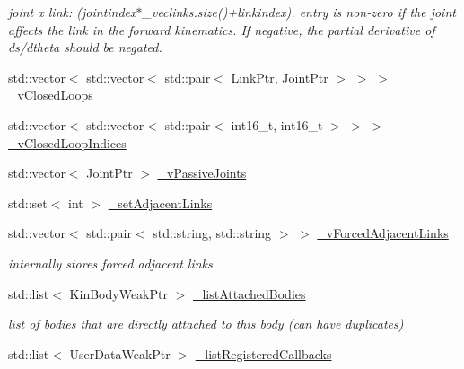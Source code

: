 \begin{DoxyCompactItemize}
\begin{DoxyCompactList}\small\item\em joint x link: (jointindex$\ast$\_\-veclinks.size()+linkindex). entry is non-\/zero if the joint affects the link in the forward kinematics. If negative, the partial derivative of ds/dtheta should be negated. \item\end{DoxyCompactList}\item 
std::vector$<$ std::vector$<$ std::pair$<$ LinkPtr, JointPtr $>$ $>$ $>$ \hyperlink{classOpenRAVE_1_1KinBody_a0c06bbb41fb3ba4098d486fd90699140}{\_\-vClosedLoops}
\item 
std::vector$<$ std::vector$<$ std::pair$<$ int16\_\-t, int16\_\-t $>$ $>$ $>$ \hyperlink{classOpenRAVE_1_1KinBody_a00df6713c1a66e68f273ae2b8aa0c5f4}{\_\-vClosedLoopIndices}
\item 
std::vector$<$ JointPtr $>$ \hyperlink{classOpenRAVE_1_1KinBody_aa70fe0334abb18115dcb5437f5425430}{\_\-vPassiveJoints}
\item 
std::set$<$ int $>$ \hyperlink{classOpenRAVE_1_1KinBody_ad20d6407270731a61d3a2877745edd29}{\_\-setAdjacentLinks}
\item 
\hypertarget{classOpenRAVE_1_1KinBody_aa4e6b1729935f161cd886466ff81e820}{
std::vector$<$ std::pair$<$ std::string, std::string $>$ $>$ \hyperlink{classOpenRAVE_1_1KinBody_aa4e6b1729935f161cd886466ff81e820}{\_\-vForcedAdjacentLinks}}
\label{classOpenRAVE_1_1KinBody_aa4e6b1729935f161cd886466ff81e820}

\begin{DoxyCompactList}\small\item\em internally stores forced adjacent links \item\end{DoxyCompactList}\item 
\hypertarget{classOpenRAVE_1_1KinBody_a7a467aa8c7f51627331d7f2dc8e71fd3}{
std::list$<$ KinBodyWeakPtr $>$ \hyperlink{classOpenRAVE_1_1KinBody_a7a467aa8c7f51627331d7f2dc8e71fd3}{\_\-listAttachedBodies}}
\label{classOpenRAVE_1_1KinBody_a7a467aa8c7f51627331d7f2dc8e71fd3}

\begin{DoxyCompactList}\small\item\em list of bodies that are directly attached to this body (can have duplicates) \item\end{DoxyCompactList}\item 
\hypertarget{classOpenRAVE_1_1KinBody_a6d824e60d7bac02b97a9643d6d555af9}{
std::list$<$ UserDataWeakPtr $>$ \hyperlink{classOpenRAVE_1_1KinBody_a6d824e60d7bac02b97a9643d6d555af9}{\_\-listRegisteredCallbacks}}
\label{classOpenRAVE_1_1KinBody_a6d824e60d7bac02b97a9643d6d555af9}


\end{DoxyCompactItemize}
